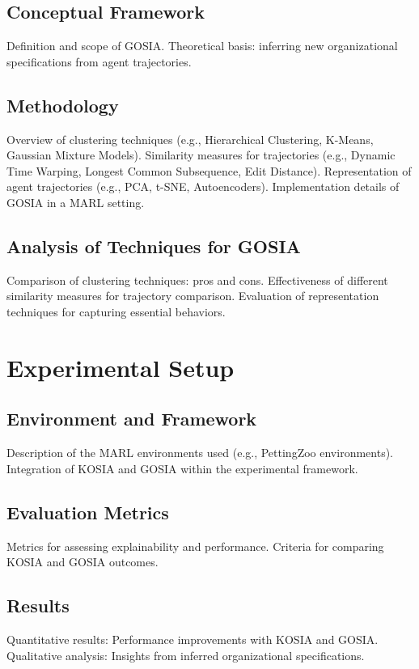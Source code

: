 \documentclass[sn-mathphys-num]{sn-jnl}%
\theoremstyle{thmstyleone}%
\theoremstyle{thmstyletwo}%
\theoremstyle{thmstylethree}%
\begin{document}
    \subsection{Conceptual Framework}
        Definition and scope of GOSIA. Theoretical basis: inferring new organizational specifications from agent trajectories.
    
    \subsection{Methodology}
        Overview of clustering techniques (e.g., Hierarchical Clustering, K-Means, Gaussian Mixture Models). Similarity measures for trajectories (e.g., Dynamic Time Warping, Longest Common Subsequence, Edit Distance). Representation of agent trajectories (e.g., PCA, t-SNE, Autoencoders). Implementation details of GOSIA in a MARL setting.
        
    \subsection{Analysis of Techniques for GOSIA}
        Comparison of clustering techniques: pros and cons. Effectiveness of different similarity measures for trajectory comparison. Evaluation of representation techniques for capturing essential behaviors.

\section{Experimental Setup}
\label{sec:experiment}
    \subsection{Environment and Framework}
        Description of the MARL environments used (e.g., PettingZoo environments). Integration of KOSIA and GOSIA within the experimental framework.
    
    \subsection{Evaluation Metrics}
        Metrics for assessing explainability and performance. Criteria for comparing KOSIA and GOSIA outcomes.
        
    \subsection{Results}
        Quantitative results: Performance improvements with KOSIA and GOSIA. Qualitative analysis: Insights from inferred organizational specifications.
    
\end{document}
